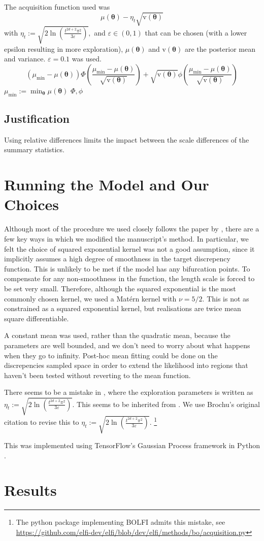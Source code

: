 The acquisition function used was 
$$\mu(\bm\theta) - \eta_t\sqrt{\mathrm{v}(\bm\theta)}$$ 
with $\eta_t:= \sqrt{2\ln(\frac{t^{2d + 2}\pi^2}{3\varepsilon})},$ and $\varepsilon \in (0, 1)$ that can be chosen (with a lower epsilon resulting in more exploration), $\mu(\bm\theta)$ and $\mathrm{v}(\bm\theta)$ are the posterior mean and variance. $\varepsilon = 0.1$ was used.
$$(\mu_\text{min} - \mu(\bm\theta))
    \varPhi\left(\frac{\mu_\text{min} - \mu(\bm\theta)}{\sqrt{\mathrm{v}(\bm\theta)}}\right) + \sqrt{\mathrm{v}(\bm\theta)}
    \phi\left(\frac{\mu_\text{min} - \mu(\bm\theta)}{\sqrt{\mathrm{v}(\bm\theta)}}\right)$$
$\mu_\text{min} := \min_{\bm{\theta}} \mu(\bm\theta)$
$\varPhi, \phi$

\subsection*{Justification}

Using relative differences limits the impact between the scale differences of the summary statistics.

\section{Running the Model and Our Choices}

Although most of the procedure we used closely follows the paper by
\cite{gutmann_bayesian_2016}, there are a few key ways in which we modified the
manuscript's method. In particular, we felt the choice of squared exponential
kernel was not a good assumption, since it implicitly assumes a high degree of
smoothness in the target discrepency function. This is unlikely to be met if
the model has any bifurcation points. To compensate for any non-smoothness in
the function, the length scale is forced to be set very small. Therefore,
although the squared exponential is the most commonly chosen kernel,
we used a Mat\'ern kernel with $\nu = 5/2$. This is not as constrained as a
squared exponential kernel, but realisations are twice mean square
differentiable.

A constant mean was used, rather than the quadratic mean, because the 
parameters are well bounded, and we don't need to worry about what happens when 
they go to infinity. Post-hoc mean fitting could be done on the discrepencies 
sampled space in order to extend the likelihood into regions that haven't been 
tested without reverting to the mean function.

There seems to be a mistake in \cite{gutmann_bayesian_2016}, where the exploration parameters is written as $\eta_t:= \sqrt{2\ln(\frac{t^{2d + 2}\pi^2}{3\varepsilon})}.$ This seems to be inherited from \cite{brochu_tutorial_2010}. We use Brochu's original citation \cite{srinivas_gaussian_2010} to revise this to $\eta_t:= \sqrt{2\ln(\frac{t^{2d + 2}\pi^2}{3\varepsilon})}.$ \footnote{The python package implementing BOLFI admits this mistake, see \url{https://github.com/elfi-dev/elfi/blob/dev/elfi/methods/bo/acquisition.py}}

This was implemented using TensorFlow's Gaussian Process framework in Python \cite{abadi_tensorflow_2015}.

\section{Results}

